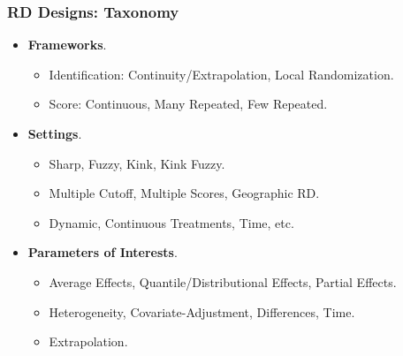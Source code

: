 \documentclass[9pt]{beamer}
\begin{document}
\begin{frame}\frametitle{RD Designs: Taxonomy}
	\begin{itemize}
		\item \textbf{Frameworks}.\medskip
		\begin{itemize}
			\item Identification: Continuity/Extrapolation,	Local Randomization.\medskip
			\item Score: Continuous, Many Repeated, Few Repeated.\bigskip
		\end{itemize}
		
		\item \textbf{Settings}.\medskip
		\begin{itemize}
			\item Sharp, Fuzzy, Kink, Kink Fuzzy.\medskip
			
			\item Multiple Cutoff, Multiple Scores, Geographic RD.\medskip
			
			\item Dynamic, Continuous Treatments, Time, etc.\bigskip
		\end{itemize}
	
		\item \textbf{Parameters of Interests}.\medskip
		\begin{itemize}
			\item Average Effects, Quantile/Distributional Effects, Partial Effects.\medskip
			\item Heterogeneity, Covariate-Adjustment, Differences, Time.\medskip
			\item Extrapolation.
		\end{itemize}
	\end{itemize}
\end{frame}
\end{document}
